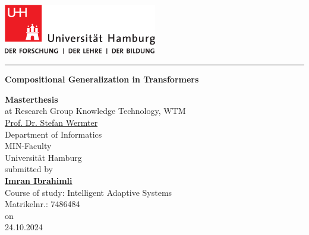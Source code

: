\documentclass[12pt,final,twoside]{report}
\author{\trauthor}
\makeatletter
\newcommand{\trtitle}{Compositional Generalization in Transformers}
\newcommand{\trtype}{Masterthesis} %
\newcommand{\trcourseofstudies}{Intelligent Adaptive Systems} %
\newcommand{\trauthor}{Imran Ibrahimli}
\newcommand{\trauthordegree}{} %
\newcommand{\tremail}{imran.ibrahimli@studium.uni-hamburg.de}
\newcommand{\trmatrikelnummer}{7486484}
\newcommand{\trgutachterA}{\href{mailto:stefan.wermter@uni-hamburg.de}{Prof. Dr. Stefan Wermter}}
\newcommand{\trfach}{Knowledge Technology, WTM}
\newcommand{\trdate}{24.10.2024}
\theoremstyle{plain}
\theoremstyle{definition}
\theoremstyle{remark}
\makeatother
\begin{document}
\renewcommand{\headheight}{14.5pt}      %

\thispagestyle{empty}
\fancyhead[LO,RE]{}                     %


\begin{titlepage}
  \begin{flushleft}
    \includegraphics[width=67mm]{uhhLogoL.pdf}\\
  \end{flushleft}
  \rule{\textwidth}{0.4pt}
  \newline
  \vspace{2.0cm}
  \begin{center}
    \LARGE \textbf{\trtitle}
  \end{center}
  \vspace{2.0cm}
  \begin{center}
    \textbf{\trtype}\\
    at Research Group \trfach\\
    \trgutachterA\medskip\\
    Department of Informatics\\
    MIN-Faculty\\
    Universit\"at Hamburg \\[1.0cm] %
    submitted by \\
    \textbf{\href{mailto:\tremail}{\trauthor\trauthordegree}}\\
    Course of study:   \trcourseofstudies \\
    Matrikelnr.:  \trmatrikelnummer \\
    on\\
    \trdate

\end{center}
\end{titlepage}
\end{document}
